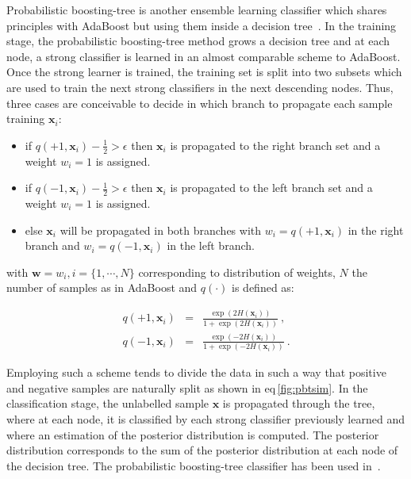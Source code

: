Probabilistic boosting-tree is another ensemble learning classifier which shares principles with AdaBoost but using them inside a decision tree~\cite{Tu2005}. 
In the training stage, the probabilistic boosting-tree method grows a decision tree and at each node, a strong classifier is learned in an almost comparable scheme to AdaBoost.
Once the strong learner is trained, the training set is split into two subsets which are used to train the next strong classifiers in the next descending nodes.
Thus, three cases are conceivable to decide in which branch to propagate each sample training $\mathbf{x}_i$:

\begin{itemize}
	\item if $q(+1, \mathbf{x}_i) - \frac{1}{2} > \epsilon$ then $\mathbf{x}_i$ is propagated to the right branch set and a weight $w_i=1$ is assigned. 
	\item if $q(-1, \mathbf{x}_i) - \frac{1}{2} > \epsilon$ then $\mathbf{x}_i$ is propagated to the left branch set and a weight $w_i=1$ is assigned.
	\item else $\mathbf{x}_i$ will be propagated in both branches with $w_i=q(+1, \mathbf{x}_i)$ in the right branch and $w_i=q(-1, \mathbf{x}_i)$ in the left branch.
\end{itemize}

\noindent with $\mathbf{w} = w_i, i=\{1,\cdots,N\}$ corresponding to distribution of weights, $N$ the number of samples as in AdaBoost and $q(\cdot)$ is defined as:

\begin{eqnarray}
	q(+1, \mathbf{x}_i) & = & \frac{\exp(2H(\mathbf{x}_i))}{1+\exp(2H(\mathbf{x}_i))} \ , \label{eq:regada1} \\
	q(-1, \mathbf{x}_i) & = & \frac{\exp(-2H(\mathbf{x}_i))}{1+\exp(-2H(\mathbf{x}_i))} \ . \label{eq:regada2}
\end{eqnarray}

Employing such a scheme tends to divide the data in such a way that positive and negative samples are naturally split as shown in \acs{eq}\,\ref{fig:pbtsim}.
In the classification stage, the unlabelled sample $\mathbf{x}$ is propagated through the tree, where at each node, it is classified by each strong classifier previously learned and where an estimation of the posterior distribution is computed.
The posterior distribution corresponds to the sum of the posterior distribution at each node of the decision tree.
The probabilistic boosting-tree classifier has been used in~\cite{Tiwari2009a,Tiwari2012,Tiwari2010,Viswanath2011}.

